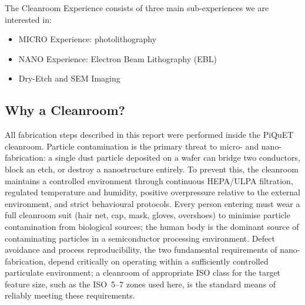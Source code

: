 The Cleanroom Experience consists of three main sub-experiences we
are interested in:
\begin{itemize}
  \item MICRO Experience: photolithography
  \item NANO Experience: Electron Beam Lithography (EBL)
  \item Dry-Etch and SEM Imaging
\end{itemize}

\subsection*{Why a Cleanroom?}

All fabrication steps described in this report were performed inside
the PiQuET cleanroom. Particle contamination is the primary threat to
micro- and nano-fabrication: a single dust particle deposited on a
wafer can bridge two conductors, block an etch, or destroy a
nanostructure entirely. To prevent this, the cleanroom maintains a
controlled environment through continuous HEPA/ULPA filtration,
regulated temperature and humidity, positive overpressure relative to
the external environment, and strict behavioural protocols. Every
person entering must wear a full cleanroom suit (hair net, cap, mask,
gloves, overshoes) to minimise particle contamination from biological
sources; the human body is the dominant source of contaminating
particles in a semiconductor processing environment. Defect avoidance
and process reproducibility, the two fundamental requirements of
nano-fabrication, depend critically on operating within a
sufficiently controlled particulate environment; a cleanroom of
appropriate ISO class for the target feature size, such as the
ISO~5--7 zones used here, is the standard means of reliably meeting
these requirements.
